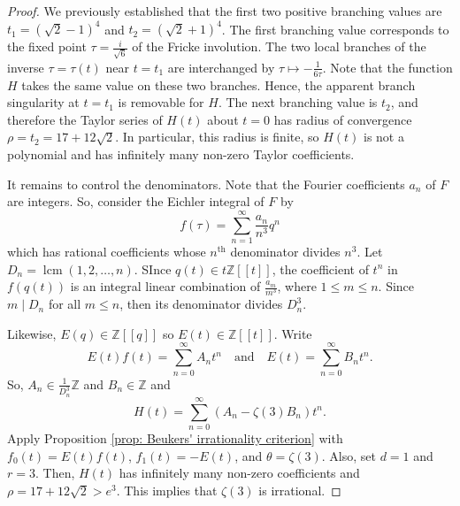 \documentclass[10pt,a4paper]{amsart}
\begin{document}
\begin{proof}
We previously established that the first two positive branching values are $t_1=(\sqrt{2}-1)^4$ and $t_2=(\sqrt{2}+1)^4$. The first branching value corresponds to the fixed point $\tau=\frac{i}{\sqrt{6}}$ of the Fricke involution. The two local branches of the inverse $\tau=\tau\left(t\right)$ near $t=t_1$ are interchanged by $\tau \mapsto -\frac{1}{6\tau}$. Note that the function $H$ takes the same value on these two branches. Hence, the apparent branch singularity at $t=t_1$ is removable for $H$. The next branching value is $t_2$, and therefore the Taylor series of $H\left(t\right)$ about $t=0$ has radius of convergence $\rho=t_2=17+12\sqrt{2}$. In particular, this radius is finite, so $H\left(t\right)$ is not a polynomial and has infinitely many non-zero Taylor coefficients.

It remains to control the denominators. Note that the Fourier coefficients $a_n$ of $F$ are integers. So, consider the Eichler integral of $F$ by \[f\left(\tau\right)=\sum_{n=1}^{\infty}\frac{a_n}{n^3}q^n\]
which has rational coefficients whose $n^\text{th}$ denominator divides $n^3$. Let $D_n=\operatorname{lcm}\left(1,2,\ldots,n\right)$. SInce $q\left(t\right)\in t\mathbb{Z}\left[\left[t\right]\right]$, the coefficient of $t^n$ in $f\left(q\left(t\right)\right)$ is an integral linear combination of $\frac{a_m}{m^3}$, where $1\le m\le n$. Since $m\mid D_n$ for all $m\le n$, then its denominator divides $D_n^3$. 

Likewise, $E\left(q\right)\in \mathbb{Z}\left[\left[q\right]\right]$ so $E\left(t\right)\in\mathbb{Z}\left[\left[t\right]\right]$. Write \[E\left(t\right)f\left(t\right)=\sum_{n=0}^{\infty}A_nt^n\quad\text{and}\quad E\left(t\right)=\sum_{n=0}^{\infty}B_nt^n.\]
So, $A_n\in \frac{1}{D_n^3}\mathbb{Z}$ and $B_n\in\mathbb{Z}$ and \[H\left(t\right)=\sum_{n=0}^{\infty}\left(A_n-\zeta\left(3\right)B_n\right)t^n.\]
Apply Proposition \ref{prop: Beukers' irrationality criterion} with $f_0\left(t\right)=E\left(t\right)f\left(t\right)$, $f_1\left(t\right)=-E\left(t\right)$, and $\theta=\zeta\left(3\right)$. Also, set $d=1$ and $r=3$. Then, $H\left(t\right)$ has infinitely many non-zero coefficients and $\rho=17+12\sqrt{2}>e^3$. This implies that $\zeta\left(3\right)$ is irrational.
\end{proof}
\end{document}
